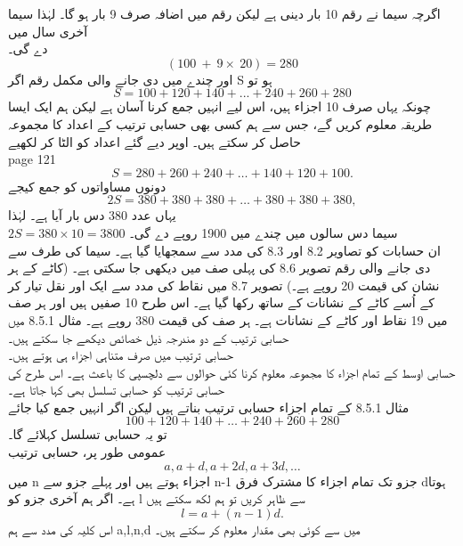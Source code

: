 اگرچہ سیما نے رقم 10 بار دینی ہے لیکن رقم میں اضافہ صرف 9 بار ہو گا۔ لہٰذا سیما آخری سال میں\\
دے گی۔\\
\[(100\ +\ 9 \times \ 20) = 280\]
اور چندے میں دی جانے والی مکمل رقم  اگر S ہو تو\\
\[S = 100 + 120 + 140 + ... + 240 + 260 + 280\]
چونکہ یہاں صرف 10 اجزاء ہیں، اس لیے انہیں جمع کرنا آسان ہے لیکن ہم ایک ایسا طریقہ معلوم کریں گے، جس سے ہم کسی بھی حسابی ترتیب کے اعداد کا مجموعہ حاصل کر سکتے ہیں۔ اوپر دیے گئے اعداد کو الٹا کر لکھیے\\
\clearpage
page 121\\
\[S=280+260+240+\dotsc+140+120+100.\]
دونوں مساواتوں کو جمع کیجے\\
\[2S=380+380+380+\dotsc+380+380+380,\]
یہاں عدد 380 دس بار آیا ہے۔ لہٰذا\\
\(2S=380\times10=3800\)
سیما دس سالوں میں چندے میں 1900 روپے دے گی۔\\
ان حسابات کو تصاویر 8.2 اور 8.3 کی مدد سے سمجھایا گیا ہے۔ سیما کی طرف سے دی جانے والی رقم تصویر 8.6 کی پہلی صف میں دیکھی جا سکتی ہے۔ (کاٹے کے ہر نشان کی قیمت 20 روپے ہے۔) تصویر 8.7 میں نقاط کی مدد سے ایک اور نقل تیار کر کے اُسے کاٹے کے نشانات کے ساتھ رکھا گیا ہے۔ اس طرح 10 صفیں ہیں اور ہر صف میں 19 نقاط اور کاٹے کے نشانات ہے۔ ہر صف کی قیمت 380 روپے ہے۔
مثال 8.5.1 میں حسابی ترتیب کے دو مندرجہ ذیل خصائص دیکھے جا سکتے ہیں۔\\
حسابی ترتیب میں صرف متناہی اجزاء ہی ہوتے ہیں۔\\
حسابی اوسط کے تمام اجزاء کا مجموعہ معلوم کرنا کئی حوالوں سے دلچسپی کا باعث ہے۔ اس طرح کی حسابی ترتیب کو حسابی تسلسل بھی کہا جاتا ہے۔\\
مثال 8.5.1 کے تمام اجزاء حسابی ترتیب بناتے ہیں لیکن اگر انہیں جمع کیا جائے\\
\[100+120+140+\dotsc+240+260+280\]
تو یہ حسابی تسلسل کہلائے گا۔\\
عمومی طور پر، حسابی ترتیب \\
\[a,a+d,a+2d,a+3d,\dotsc\]
میں n اجزاء ہوتے ہیں اور پہلے جزو سے n-1 جزو تک تمام اجزاء کا مشترک فرق dہوتا ہے۔ اگر ہم آخری جزو کو l سے ظاہر کریں تو ہم لکھ سکتے ہیں\\
\[l=a+(n-1)d.\]
اس کلیہ کی مدد سے ہم a,l,n,d میں سے کوئی بھی مقدار معلوم کر سکتے ہیں۔\\

